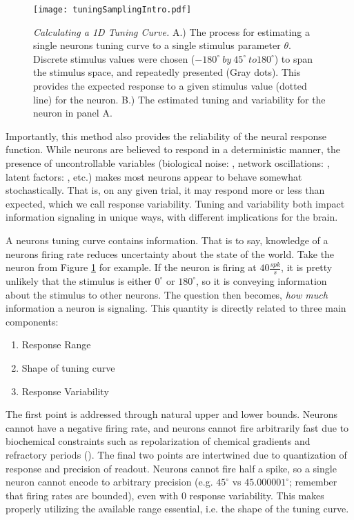 \begin{figure}[h]
	\centerline{\texttt{[image: tuningSamplingIntro.pdf]}}
	\caption{\textit{Calculating a 1D Tuning Curve.} A.) The process for estimating a single neurons tuning curve to a single stimulus parameter $\theta$. Discrete stimulus values were chosen ($-180^\circ\ by\ 45^\circ\ to 180^\circ$) to span the stimulus space, and repeatedly presented (Gray dots). This provides the expected response to a given stimulus value (dotted line) for the neuron. B.) The estimated tuning and variability for the neuron in panel A.}
	\label{fig:tuningIntro}
\end{figure}

Importantly, this method also provides the reliability of the neural response function. While neurons are believed to respond in a deterministic manner, the presence of uncontrollable variables (biological noise: \cite{Faisal2008}, network oscillations: \cite{Fries2005}, latent factors: \cite{Yu2009, Chen2006}, etc.) makes most neurons appear to behave somewhat stochastically. That is, on any given trial, it may respond more or less than expected, which we call response variability. Tuning and variability both impact information signaling in unique ways, with different implications for the brain. 

A neurons tuning curve contains information. That is to say, knowledge of a neurons firing rate reduces uncertainty about the state of the world. Take the neuron from Figure \ref{fig:tuningIntro} for example. If the neuron is firing at $40\frac{spk}{s}$, it is pretty unlikely that the stimulus is either $0^\circ$ or $180^\circ$, so it is conveying information about the stimulus to other neurons. The question then becomes, \textit{how much} information a neuron is signaling. This quantity is directly related to three main components:

\begin{enumerate}
	\item Response Range
	\item Shape of tuning curve
	\item Response Variability
\end{enumerate}

The first point is addressed through natural upper and lower bounds. Neurons cannot have a negative firing rate, and neurons cannot fire arbitrarily fast due to biochemical constraints such as repolarization of chemical gradients and refractory periods (\cite{Kole2012}). The final two points are intertwined due to quantization of response and precision of readout. Neurons cannot fire half a spike, so a single neuron cannot encode to arbitrary precision (e.g. $45^\circ$ vs $45.000001^\circ$; remember that firing rates are bounded), even with 0 response variability. This makes properly utilizing the available range essential, i.e. the shape of the tuning curve.

